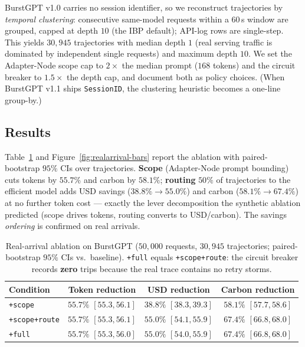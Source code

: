 \documentclass[11pt]{article}
\theoremstyle{plain}
\theoremstyle{definition}
\theoremstyle{remark}
\begin{document}
BurstGPT v1.0 carries no session identifier, so we reconstruct trajectories by \emph{temporal clustering}: consecutive same-model requests within a $60$\,s window are grouped, capped at depth $10$ (the IBP default); API-log rows are single-step. This yields $30{,}945$ trajectories with median depth $1$ (real serving traffic is dominated by independent single requests) and maximum depth $10$. We set the Adapter-Node scope cap to $2\times$ the median prompt ($168$ tokens) and the circuit breaker to $1.5\times$ the depth cap, and document both as policy choices. (When BurstGPT v1.1 ships \texttt{SessionID}, the clustering heuristic becomes a one-line group-by.)

\subsection{Results}
Table~\ref{tab:realarrival} and Figure~\ref{fig:realarrival-bars} report the ablation with paired-bootstrap $95\%$ CIs over trajectories. \textbf{Scope} (Adapter-Node prompt bounding) cuts tokens by $55.7\%$ and carbon by $58.1\%$; \textbf{routing} $50\%$ of trajectories to the efficient model adds USD savings ($38.8\%\to55.0\%$) and carbon ($58.1\%\to67.4\%$) at no further token cost --- exactly the lever decomposition the synthetic ablation predicted (scope drives tokens, routing converts to USD/carbon). The savings \emph{ordering} is confirmed on real arrivals.

\begin{table}[H]
\centering\small
\begin{tabular}{@{}lccc@{}}
\toprule
Condition & Token reduction & USD reduction & Carbon reduction \\
\midrule
\texttt{+scope}       & $55.7\%$ $[55.3,56.1]$ & $38.8\%$ $[38.3,39.3]$ & $58.1\%$ $[57.7,58.6]$ \\
\texttt{+scope+route} & $55.7\%$ $[55.3,56.1]$ & $55.0\%$ $[54.1,55.9]$ & $67.4\%$ $[66.8,68.0]$ \\
\texttt{+full}        & $55.7\%$ $[55.3,56.0]$ & $55.0\%$ $[54.0,55.9]$ & $67.4\%$ $[66.8,68.0]$ \\
\bottomrule
\end{tabular}
\caption{Real-arrival ablation on BurstGPT ($50{,}000$ requests, $30{,}945$ trajectories; paired-bootstrap $95\%$ CIs vs.\ baseline). \texttt{+full} equals \texttt{+scope+route}: the circuit breaker records \textbf{zero} trips because the real trace contains no retry storms.}
\label{tab:realarrival}
\end{table}
\end{document}
